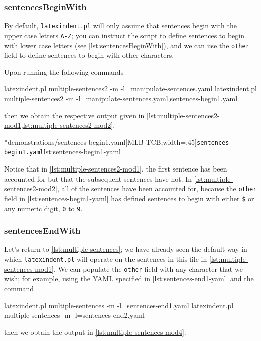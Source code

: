 \subsubsection{sentencesBeginWith}
	By default, \texttt{latexindent.pl} will only assume that sentences begin with the
	upper case letters \texttt{A-Z}; you can instruct the script to define
	sentences to begin with lower case letters (see \cref{lst:sentencesBeginWith}), and we can
	use the \texttt{other} field to define sentences to begin with other
	characters.


	Upon running the following commands
	\begin{widepage}
		\begin{commandshell}
latexindent.pl multiple-sentences2 -m -l=manipulate-sentences.yaml
latexindent.pl multiple-sentences2 -m -l=manipulate-sentences.yaml,sentences-begin1.yaml
	\end{commandshell}
	\end{widepage}
	then we obtain the respective output given in \cref{lst:multiple-sentences2-mod1,lst:multiple-sentences2-mod2}.

	\begin{cmhtcbraster}[
			raster force size=false,
			raster column 1/.style={add to width=1cm},
		]
		\cmhlistingsfromfile[style=yaml-LST]*{demonstrations/sentences-begin1.yaml}[MLB-TCB,width=.45\textwidth]{\texttt{sentences-begin1.yaml}}{lst:sentences-begin1-yaml}
	\end{cmhtcbraster}
	Notice that in \cref{lst:multiple-sentences2-mod1}, the first sentence has been accounted for but
	that the subsequent sentences have not. In \cref{lst:multiple-sentences2-mod2}, all of the
	sentences have been accounted for, because the \texttt{other} field in
	\cref{lst:sentences-begin1-yaml} has defined sentences to begin with either
	\lstinline!$! or any numeric digit, \texttt{0} to
	\texttt{9}.

\subsubsection{sentencesEndWith}
	Let's return to \vref{lst:multiple-sentences}; we have already seen the default way in
	which \texttt{latexindent.pl} will operate on the sentences in this file in
	\vref{lst:multiple-sentences-mod1}. We can populate the \texttt{other} field with
	any character that we wish; for example, using the YAML specified in
	\cref{lst:sentences-end1-yaml} and the command
	\begin{commandshell}
latexindent.pl multiple-sentences -m -l=sentences-end1.yaml
latexindent.pl multiple-sentences -m -l=sentences-end2.yaml
\end{commandshell}
	then we obtain the output in \cref{lst:multiple-sentences-mod4}.

